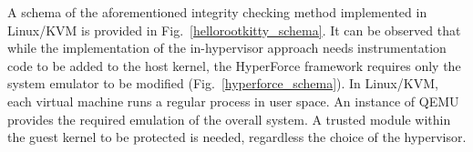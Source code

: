 %
%
A schema of the aforementioned integrity checking method implemented in Linux/KVM is provided in Fig.~\ref{hellorootkitty_schema}. It can be observed that while the implementation of the in-hypervisor approach needs instrumentation code to be added to the host kernel, the HyperForce framework requires only the system emulator to be modified (Fig.~\ref{hyperforce_schema}). In Linux/KVM, each virtual machine runs a regular process in user space. An instance of QEMU provides the required emulation of the overall system. A trusted module within the guest kernel to be protected is needed, regardless the choice of the hypervisor.



